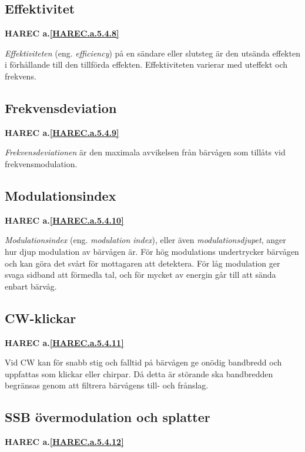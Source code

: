 \subsection{Effektivitet}
\textbf{HAREC
  a.\ref{HAREC.a.5.4.8}\label{myHAREC.a.5.4.8}
}

\emph{Effektiviteten} (eng. \emph{efficiency}) på en sändare eller slutsteg
är den utsända effekten i förhållande till den tillförda effekten.
Effektiviteten varierar med uteffekt och frekvens.

\subsection{Frekvensdeviation}
\textbf{HAREC
  a.\ref{HAREC.a.5.4.9}\label{myHAREC.a.5.4.9}
}

\emph{Frekvensdeviationen} är den maximala avvikelsen från bärvågen som
tillåts vid frekvensmodulation.

\subsection{Modulationsindex}
\textbf{HAREC
  a.\ref{HAREC.a.5.4.10}\label{myHAREC.a.5.4.10}
}

\emph{Modulationsindex} (eng. \emph{modulation index}), eller även
\emph{modulationsdjupet}, anger hur djup modulation av bärvågen är.
För hög modulations undertrycker bärvågen och kan göra det svårt för
mottagaren att detektera.
För låg modulation ger svaga sidband att förmedla tal, och för mycket
av energin går till att sända enbart bärvåg.

\subsection{CW-klickar}
\textbf{HAREC
  a.\ref{HAREC.a.5.4.11}\label{myHAREC.a.5.4.11}
}

Vid CW kan för snabb stig och falltid på bärvågen ge onödig bandbredd och
uppfattas som klickar eller chirpar. Då detta är störande ska bandbredden
begränsas genom att filtrera bärvågens till- och frånslag.

\subsection{SSB övermodulation och splatter}
\textbf{HAREC
  a.\ref{HAREC.a.5.4.12}\label{myHAREC.a.5.4.12}
}

